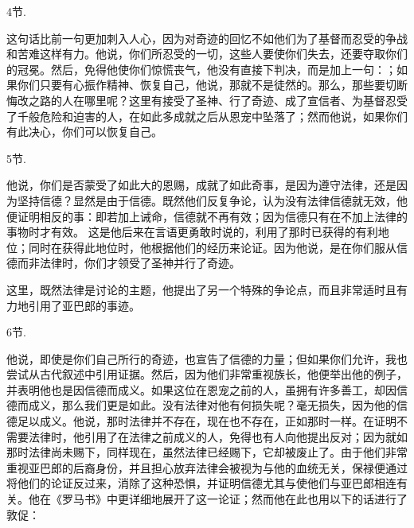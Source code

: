 4节. \par

这句话比前一句更加刺入人心，因为对奇迹的回忆不如他们为了基督而忍受的争战和苦难这样有力。他说，你们所忍受的一切，这些人要使你们失去，还要夺取你们的冠冕。然后，免得他使你们惊慌丧气，他没有直接下判决，而是加上一句：；如果你们只要有心振作精神、恢复自己，他说，那就不是徒然的。那么，那些要切断悔改之路的人在哪里呢？这里有接受了圣神、行了奇迹、成了宣信者、为基督忍受了千般危险和迫害的人，在如此多成就之后从恩宠中坠落了；然而他说，如果你们有此决心，你们可以恢复自己。\par

5节. \par

他说，你们是否蒙受了如此大的恩赐，成就了如此奇事，是因为遵守法律，还是因为坚持信德？显然是由于信德。既然他们反复争论，认为没有法律信德就无效，他便证明相反的事：即若加上诫命，信德就不再有效；因为信德只有在不加上法律的事物时才有效。 这是他后来在言语更勇敢时说的，利用了那时已获得的有利地位；同时在获得此地位时，他根据他们的经历来论证。因为他说，是在你们服从信德而非法律时，你们才领受了圣神并行了奇迹。\par

这里，既然法律是讨论的主题，他提出了另一个特殊的争论点，而且非常适时且有力地引用了亚巴郎的事迹。\par

6节. \par

他说，即使是你们自己所行的奇迹，也宣告了信德的力量；但如果你们允许，我也尝试从古代叙述中引用证据。然后，因为他们非常重视族长，他便举出他的例子，并表明他也是因信德而成义。如果这位在恩宠之前的人，虽拥有许多善工，却因信德而成义，那么我们更是如此。没有法律对他有何损失呢？毫无损失，因为他的信德足以成义。他说，那时法律并不存在，现在也不存在，正如那时一样。在证明不需要法律时，他引用了在法律之前成义的人，免得也有人向他提出反对；因为就如那时法律尚未赐下，同样现在，虽然法律已经赐下，它却被废止了。由于他们非常重视亚巴郎的后裔身份，并且担心放弃法律会被视为与他的血统无关，保禄便通过将他们的论证反过来，消除了这种恐惧，并证明信德尤其与使他们与亚巴郎相连有关。他在《罗马书》中更详细地展开了这一论证；然而他在此也用以下的话进行了敦促：\par

